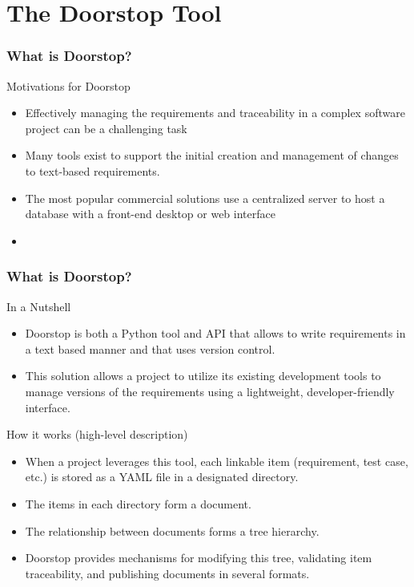 \documentclass[aspectratio=169]{beamer}
\begin{document}
\begin{frame}[fragile]
\begin{frame}[fragile]
\begin{frame}[fragile]
\begin{frame}
\end{frame}

\section*{The Doorstop Tool}


\begin{frame}
  \frametitle{What is Doorstop?}
  \begin{block}{Motivations for Doorstop}
  \begin{itemize}
    \item Effectively managing the requirements and traceability in a complex software project can be a
challenging task
    \item Many tools exist to support the initial creation and management of changes to
text-based requirements.
    \item The most popular commercial solutions use a centralized server to host
a database with a front-end desktop or web interface
    \item {\bf }
  \end{itemize}
  
  \end{block}

   
\end{frame}

\begin{frame}
  \frametitle{What is Doorstop?}
  \begin{block}{In a Nutshell}
  \begin{itemize}
    \item Doorstop is both a Python tool and API that allows to write requirements in a text based manner and that uses version control. 
    \item This solution allows a project to utilize its existing development tools to manage versions of the requirements using a lightweight, developer-friendly interface.
  \end{itemize}
  \end{block}
  \begin{block}{How it works (high-level description)}
  \begin{itemize}
  \item When a project leverages this tool, each linkable item (requirement, test case, etc.) is stored as a YAML file in a designated directory. 
  \item The items in each directory form a document.
  \item The relationship between documents forms a tree hierarchy.
  \item Doorstop provides mechanisms for modifying this tree, validating item traceability, and publishing documents in several formats.  
  \end{itemize}

       
  \end{block}

  
\end{frame}
\end{document}
